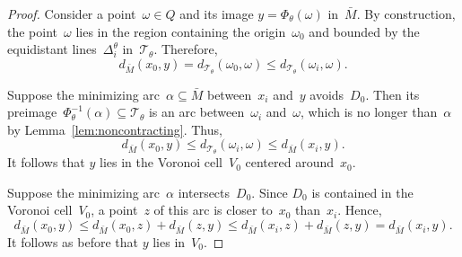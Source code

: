 \documentclass[10pt,a4paper]{amsart}
\begin{document}
\begin{proof}
Consider a point~$\omega \in Q$ and its image $y=\Phi_\theta(\omega)$ in~$\bar{M}$.
By construction, the point~$\omega$ lies in the region containing the origin~$\omega_0$ and bounded by the equidistant lines~$\Delta_i^\theta$ in~$\mathcal{T}_\theta$.
Therefore,
\[
d_{\bar{M}}(x_0,y) = d_{\mathcal{T}_\theta}(\omega_0,\omega) \leq d_{\mathcal{T}_\theta}(\omega_i,\omega).
\]

Suppose the minimizing arc~$\alpha \subseteq \bar{M}$ between~$x_i$ and~$y$ avoids~$D_0$.
Then its preimage~$\Phi^{-1}_\theta(\alpha) \subseteq \mathcal{T}_\theta$ is an arc between~$\omega_i$ and~$\omega$, which is no longer than~$\alpha$ by Lemma~\ref{lem:noncontracting}.
Thus,
\[
d_{\bar{M}}(x_0,y) \leq d_{\mathcal{T}_\theta}(\omega_i,\omega) \leq d_{\bar{M}}(x_i,y).
\]
It follows that $y$ lies in the Voronoi cell~$V_0$ centered around~$x_0$.

Suppose the minimizing arc~$\alpha$ intersects~$D_0$.
Since $D_0$ is contained in the Voronoi cell~$V_0$, a point~$z$ of this arc is closer to~$x_0$ than~$x_i$.
Hence,
\[
d_{\bar{M}}(x_0,y) \leq d_{\bar{M}}(x_0,z) + d_{\bar{M}}(z,y) \leq d_{\bar{M}}(x_i,z) + d_{\bar{M}}(z,y) = d_{\bar{M}}(x_i,y).
\]
It follows as before that $y$ lies in~$V_0$.
\end{proof}
\end{document}
